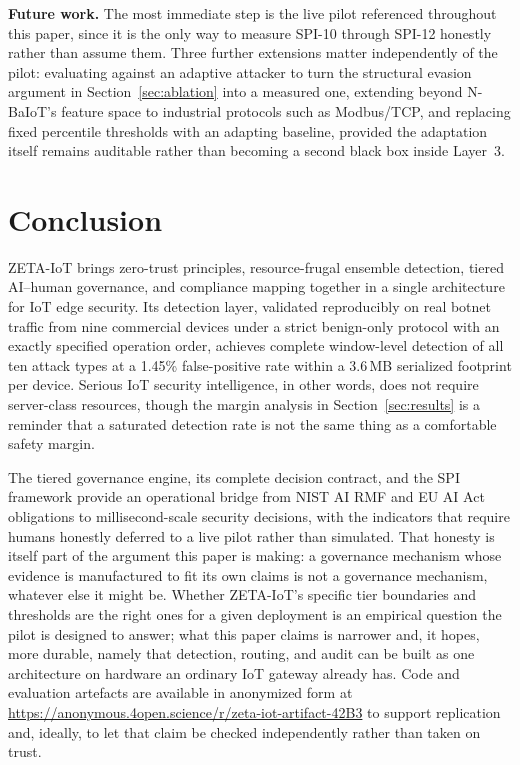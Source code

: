 \documentclass[sigconf,review,anonymous]{acmart}
\begin{document}
\textbf{Future work.} The most immediate step is the live pilot referenced throughout this paper, since it is the only way to measure SPI-10 through SPI-12 honestly rather than assume them. Three further extensions matter independently of the pilot: evaluating against an adaptive attacker to turn the structural evasion argument in Section~\ref{sec:ablation} into a measured one, extending beyond N-BaIoT's feature space to industrial protocols such as Modbus/TCP, and replacing fixed percentile thresholds with an adapting baseline, provided the adaptation itself remains auditable rather than becoming a second black box inside Layer~3.

\section{Conclusion}
ZETA-IoT brings zero-trust principles, resource-frugal ensemble detection, tiered AI--human governance, and compliance mapping together in a single architecture for IoT edge security. Its detection layer, validated reproducibly on real botnet traffic from nine commercial devices under a strict benign-only protocol with an exactly specified operation order, achieves complete window-level detection of all ten attack types at a 1.45\% false-positive rate within a 3.6\,MB serialized footprint per device. Serious IoT security intelligence, in other words, does not require server-class resources, though the margin analysis in Section~\ref{sec:results} is a reminder that a saturated detection rate is not the same thing as a comfortable safety margin.

The tiered governance engine, its complete decision contract, and the SPI framework provide an operational bridge from NIST AI RMF and EU AI Act obligations to millisecond-scale security decisions, with the indicators that require humans honestly deferred to a live pilot rather than simulated. That honesty is itself part of the argument this paper is making: a governance mechanism whose evidence is manufactured to fit its own claims is not a governance mechanism, whatever else it might be. Whether ZETA-IoT's specific tier boundaries and thresholds are the right ones for a given deployment is an empirical question the pilot is designed to answer; what this paper claims is narrower and, it hopes, more durable, namely that detection, routing, and audit can be built as one architecture on hardware an ordinary IoT gateway already has. Code and evaluation artefacts are available in anonymized form at \url{https://anonymous.4open.science/r/zeta-iot-artifact-42B3} to support replication and, ideally, to let that claim be checked independently rather than taken on trust.




\end{document}
